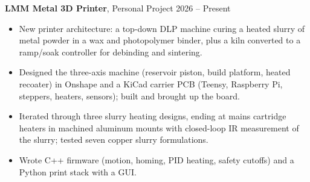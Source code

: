 \textbf{LMM Metal 3D Printer}, Personal Project \hfill 2026 -- Present
\begin{itemize}[noitemsep, topsep=0pt, partopsep=0pt, parsep=0pt]
    \item New printer architecture: a top-down DLP machine curing a heated slurry of metal powder in a wax and photopolymer binder, plus a kiln converted to a ramp/soak controller for debinding and sintering.

    \item Designed the three-axis machine (reservoir piston, build platform, heated recoater) in Onshape and a KiCad carrier PCB (Teensy, Raspberry Pi, steppers, heaters, sensors); built and brought up the board.

    \item Iterated through three slurry heating designs, ending at mains cartridge heaters in machined aluminum mounts with closed-loop IR measurement of the slurry; tested seven copper slurry formulations.

    \item Wrote C++ firmware (motion, homing, PID heating, safety cutoffs) and a Python print stack with a GUI.
\end{itemize}
